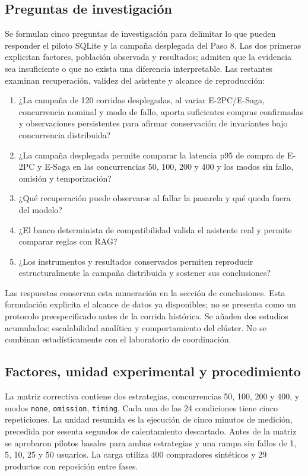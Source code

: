 \documentclass[12pt,a4paper]{article}
\begin{document}
\subsection{Preguntas de investigación}\label{sec:preguntas-investigacion}
Se formulan cinco preguntas de investigación para delimitar lo que pueden responder el piloto SQLite y la campaña desplegada del Paso 8. Las dos primeras explicitan factores, población observada y resultados; admiten que la evidencia sea insuficiente o que no exista una diferencia interpretable. Las restantes examinan recuperación, validez del asistente y alcance de reproducción:
\begin{enumerate}
\item ¿La campaña de 120 corridas desplegadas, al variar E-2PC/E-Saga, concurrencia nominal y modo de fallo, aporta suficientes compras confirmadas y observaciones persistentes para afirmar conservación de invariantes bajo concurrencia distribuida?
\item ¿La campaña desplegada permite comparar la latencia p95 de compra de E-2PC y E-Saga en las concurrencias 50, 100, 200 y 400 y los modos sin fallo, omisión y temporización?
\item ¿Qué recuperación puede observarse al fallar la pasarela y qué queda fuera del modelo?
\item ¿El banco determinista de compatibilidad valida el asistente real y permite comparar reglas con RAG?
\item ¿Los instrumentos y resultados conservados permiten reproducir estructuralmente la campaña distribuida y sostener sus conclusiones?
\end{enumerate}
Las respuestas conservan esta numeración en la sección de conclusiones. Esta formulación explicita el alcance de datos ya disponibles; no se presenta como un protocolo preespecificado antes de la corrida histórica. Se añaden dos estudios acumulados: escalabilidad analítica y comportamiento del clúster. No se combinan estadísticamente con el laboratorio de coordinación.

\subsection{Factores, unidad experimental y procedimiento}
La matriz correctiva contiene dos estrategias, concurrencias 50, 100, 200 y 400, y modos \texttt{none}, \texttt{omission}, \texttt{timing}. Cada una de las 24 condiciones tiene cinco repeticiones. La unidad resumida es la ejecución de cinco minutos de medición, precedida por sesenta segundos de calentamiento descartado. Antes de la matriz se aprobaron pilotos basales para ambas estrategias y una rampa sin fallos de 1, 5, 10, 25 y 50 usuarios. La carga utiliza 400 compradores sintéticos y 29 productos con reposición entre fases.
\end{document}

